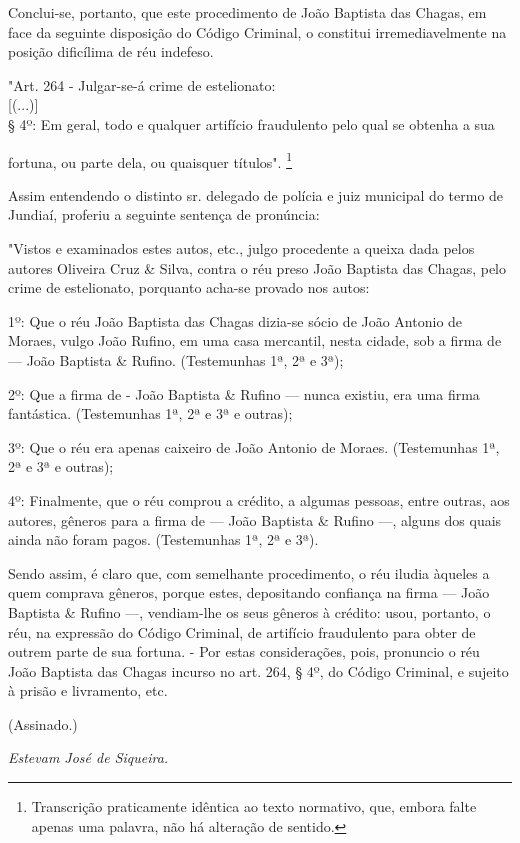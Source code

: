 Conclui-se, portanto, que este procedimento de João Baptista das Chagas,
em face da seguinte disposição do Código Criminal, o constitui
irremediavelmente na posição dificílima de réu indefeso.

"Art. 264 - Julgar-se-á crime de estelionato:\\
{[}(...){]}\\
§ 4º: Em geral, todo e qualquer artifício fraudulento pelo qual se
obtenha a sua

fortuna, ou parte dela, ou quaisquer títulos". \footnote{Transcrição
  praticamente idêntica ao texto normativo, que, embora falte apenas uma
  palavra, não há alteração de sentido.}

Assim entendendo o distinto sr. delegado de polícia e juiz municipal do
termo de Jundiaí, proferiu a seguinte sentença de pronúncia:

"Vistos e examinados estes autos, etc., julgo procedente a queixa dada
pelos autores Oliveira Cruz \& Silva, contra o réu preso João Baptista
das Chagas, pelo crime de estelionato, porquanto acha-se provado nos
autos:

1º: Que o réu João Baptista das Chagas dizia-se sócio de João Antonio de
Moraes, vulgo João Rufino, em uma casa mercantil, nesta cidade, sob a
firma de --- João Baptista \& Rufino. (Testemunhas 1ª, 2ª e 3ª);

2º: Que a firma de - João Baptista \& Rufino --- nunca existiu, era uma
firma fantástica. (Testemunhas 1ª, 2ª e 3ª e outras);

3º: Que o réu era apenas caixeiro de João Antonio de Moraes.
(Testemunhas 1ª, 2ª e 3ª e outras);

4º: Finalmente, que o réu comprou a crédito, a algumas pessoas, entre
outras, aos autores, gêneros para a firma de --- João Baptista \&
Rufino ---, alguns dos quais ainda não foram pagos. (Testemunhas 1ª, 2ª
e 3ª).

Sendo assim, é claro que, com semelhante procedimento, o réu iludia
àqueles a quem comprava gêneros, porque estes, depositando confiança na
firma --- João Baptista \& Rufino ---, vendiam-lhe os seus gêneros à
crédito: usou, portanto, o réu, na expressão do Código Criminal, de
artifício fraudulento para obter de outrem parte de sua fortuna. - Por
estas considerações, pois, pronuncio o réu João Baptista das Chagas
incurso no art. 264, § 4º, do Código Criminal, e sujeito à prisão e
livramento, etc.

(Assinado.)

\emph{Estevam José de Siqueira. }

